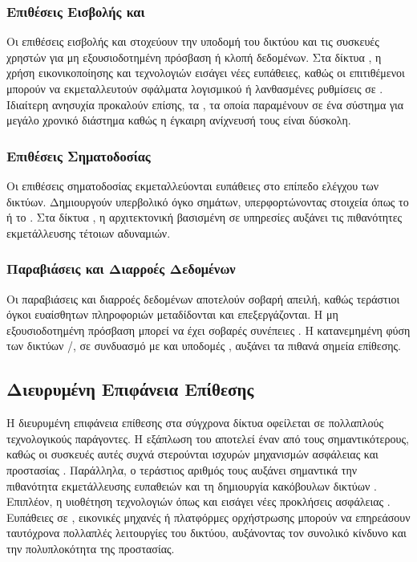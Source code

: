 \subsubsection{Επιθέσεις Εισβολής και }

Οι επιθέσεις εισβολής και  στοχεύουν την υποδομή του δικτύου και τις συσκευές χρηστών για μη εξουσιοδοτημένη πρόσβαση ή κλοπή δεδομένων. Στα δίκτυα , η χρήση εικονικοποίησης και  τεχνολογιών εισάγει νέες ευπάθειες, καθώς οι επιτιθέμενοι μπορούν να εκμεταλλευτούν σφάλματα λογισμικού ή λανθασμένες ρυθμίσεις σε  \cite{ahmed2020survey}. Ιδιαίτερη ανησυχία προκαλούν επίσης, τα , τα οποία παραμένουν σε ένα σύστημα για μεγάλο χρονικό διάστημα καθώς η έγκαιρη ανίχνευσή τους είναι δύσκολη.

\subsubsection{Επιθέσεις Σηματοδοσίας}

Οι επιθέσεις σηματοδοσίας εκμεταλλεύονται ευπάθειες στο επίπεδο ελέγχου των δικτύων. Δημιουργούν υπερβολικό όγκο σημάτων, υπερφορτώνοντας στοιχεία όπως το  ή το  \cite{li2018signaling}. Στα δίκτυα , η αρχιτεκτονική βασισμένη σε υπηρεσίες αυξάνει τις πιθανότητες εκμετάλλευσης τέτοιων αδυναμιών.

\subsubsection{Παραβιάσεις και Διαρροές Δεδομένων}

Οι παραβιάσεις και διαρροές δεδομένων αποτελούν σοβαρή απειλή, καθώς τεράστιοι όγκοι ευαίσθητων πληροφοριών μεταδίδονται και επεξεργάζονται. Η μη εξουσιοδοτημένη πρόσβαση μπορεί να έχει σοβαρές συνέπειες \cite{roman2018mobile}. Η κατανεμημένη φύση των δικτύων /, σε συνδυασμό με  και υποδομές , αυξάνει τα πιθανά σημεία επίθεσης.

\subsection{Διευρυμένη Επιφάνεια Επίθεσης}

Η διευρυμένη επιφάνεια επίθεσης στα σύγχρονα δίκτυα οφείλεται σε πολλαπλούς τεχνολογικούς παράγοντες. Η εξάπλωση του  αποτελεί έναν από τους σημαντικότερους, καθώς οι συσκευές αυτές συχνά στερούνται ισχυρών μηχανισμών ασφάλειας και προστασίας \cite{atzori2010internet}. Παράλληλα, ο τεράστιος αριθμός τους αυξάνει σημαντικά την πιθανότητα εκμετάλλευσης ευπαθειών και τη δημιουργία κακόβουλων δικτύων . Επιπλέον, η υιοθέτηση τεχνολογιών όπως  και  εισάγει νέες προκλήσεις ασφάλειας \cite{kreutz2015software}. Ευπάθειες σε , εικονικές μηχανές ή πλατφόρμες ορχήστρωσης μπορούν να επηρεάσουν ταυτόχρονα πολλαπλές λειτουργίες του δικτύου, αυξάνοντας τον συνολικό κίνδυνο και την πολυπλοκότητα της προστασίας.

